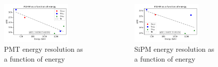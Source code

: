 \begin{frame}[plain]
    \begin{columns}
        \begin{column}{0.5\textwidth}
            \begin{figure}
                \centering
                \includegraphics[width=0.8\textwidth]{images/PMT_dE_ov_E.png}
                \caption{PMT energy resolution as a function of energy}
            \end{figure}
        \end{column}
        \begin{column}{0.5\textwidth}
            \begin{figure}
                \centering
                \includegraphics[width=0.8\textwidth]{images/SiPM_dE_ov_E.png}
                \caption{SiPM energy resolution as a function of energy}
            \end{figure}
        \end{column}
    \end{columns}
\end{frame}

